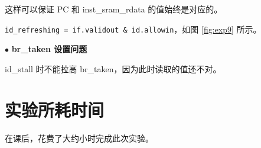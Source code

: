 \documentclass[11pt]{article}
\begin{document}
这样可以保证 PC 和 inst_sram_rdata 的值始终是对应的。

\verb|id_refreshing = if.validout & id.allowin|，如图 \cref{fig:exp9} 所示。

\vspace{1ex}
\noindent
$\bullet$
\textbf{br_taken 设置问题}

id_stall 时不能拉高 br_taken，因为此时读取的值还不对。

\section{实验所耗时间}

\newcommand{\labTime}{10}

在课后，花费了大约\underline{\makebox[5em][c]{\labTime}}小时完成此次实验。
\end{document}
